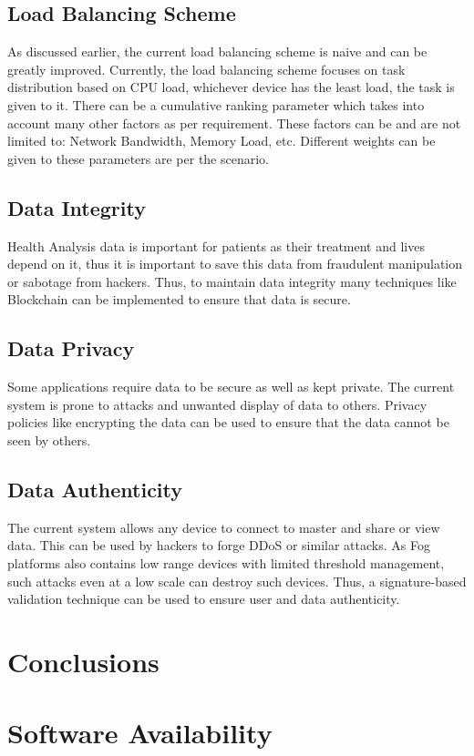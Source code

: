 \documentclass[AMA,STIX1COL]{WileyNJD-v2}
\begin{document}
\subsection{Load Balancing Scheme}
As discussed earlier, the current load balancing scheme is naive and can be greatly improved. Currently, the load balancing scheme focuses on task distribution based on CPU load, whichever device has the least load, the task is given to it. There can be a cumulative ranking parameter which takes into account many other factors as per requirement. These factors can be and are not limited to: Network Bandwidth, Memory Load, etc. Different weights can be given to these parameters are per the scenario. 

\subsection{Data Integrity}
Health Analysis data is important for patients as their treatment and lives depend on it, thus it is important to save this data from fraudulent manipulation or sabotage from hackers. Thus, to maintain data integrity many techniques like Blockchain can be implemented to ensure that data is secure. 

\subsection{Data Privacy}
Some applications require data to be secure as well as kept private. The current system is prone to attacks and unwanted display of data to others. Privacy policies like encrypting the data can be used to ensure that the data cannot be seen by others. 

\subsection{Data Authenticity}
The current system allows any device to connect to master and share or view data. This can be used by hackers to forge DDoS or similar attacks. As Fog platforms also contains low range devices with limited threshold management, such attacks even at a low scale can destroy such devices. Thus, a signature-based validation technique can be used to ensure user and data authenticity.


\section{Conclusions}

\section{Software Availability}



\end{document}
